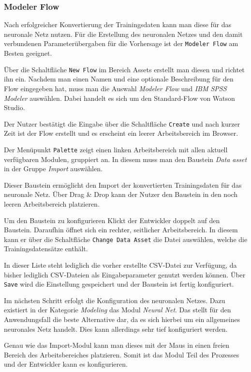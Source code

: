 \subsubsection{Modeler Flow}
\label{subsub:modeler_flow}
Nach erfolgreicher Konvertierung der Trainingsdaten kann man diese für das neuronale Netz nutzen. Für die Erstellung
des neuronalen Netzes und den damit verbundenen Parameterübergaben für die Vorhersage ist der \texttt{Modeler Flow} am
Besten geeignet.

Über die Schaltfläche \texttt{New Flow} im Bereich Assets erstellt man diesen und richtet ihn ein. Nachdem man einen Namen
und eine optionale Beschreibung für den Flow eingegeben hat, muss man die Auswahl \textit{Modeler Flow} und
\textit{IBM SPSS Modeler} auswählen. Dabei handelt es sich um den Standard-Flow von Watson Studio.

Der Nutzer bestätigt die Eingabe über die Schaltfläche \texttt{Create} und nach kurzer Zeit ist der Flow erstellt und es
erscheint ein leerer Arbeitsbereich im Browser.

Der Menüpunkt \texttt{Palette} zeigt einen linken Arbeitsbereich mit allen aktuell verfügbaren Modulen, gruppiert an. In
diesem muss man den Baustein \textit{Data asset} in der Gruppe \textit{Import} auswählen.

Dieser Baustein ermöglicht den Import der konvertierten Trainingsdaten für das neuronale Netz. Über Drag \& Drop kann der
Nutzer den Baustein in den noch leeren Arbeitsbereich platzieren.

Um den Baustein zu konfigurieren Klickt der Entwickler doppelt auf den Baustein. Daraufhin öffnet sich ein rechter,
seitlicher Arbeitsbereich. In diesem kann er über die Schaltfläche \texttt{Change Data Asset} die Datei auswählen, welche
die Trainingsdatensätze enthält.

In dieser Liste steht lediglich die vorher erstellte CSV-Datei zur Verfügung, da bisher lediglich CSV-Dateien als
Eingabeparameter genutzt werden können. Über \texttt{Save} wird die Einstellung gespeichert und der Baustein ist fertig
konfiguriert.

Im nächsten Schritt erfolgt die Konfiguration des neuronalen Netzes. Dazu existiert in der Kategorie \textit{Modeling}
das Modul \textit{Neural Net}. Das stellt für den Anwendungsfall die beste Alternative dar, da es sich hierbei um ein
allgemeines neuronales Netz handelt. Dies kann allerdings sehr tief konfiguriert werden.

Genau wie das Import-Modul kann man dieses mit der Maus in einen freien Bereich des Arbeitsbereiches platzieren. Somit
ist das Modul Teil des Prozesses und der Entwickler kann es konfigurieren.

